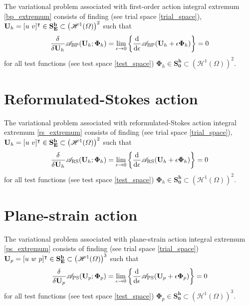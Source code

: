 The variational problem associated with first-order action integral extremum \cref{bp_extremum} consists of finding (see trial space \cref{trial_space}), $\mathbf{U}_h = [u\ v]^\intercal \in \mathbf{S_E^h} \subset \left( \mathscr{H}^1(\varOmega) \right)^2$ such that
\begin{align}
  \label{first_order_var_form_2}
  \frac{\delta{^{}} }{\delta \mathbf{U}_h{^{}} } \mathscr{A}_{\text{BP}}(\mathbf{U}_h; \bm{\Phi}_h) = \lim_{\epsilon \rightarrow 0} \left\{ \frac{\mathrm{d}{^{}} }{\mathrm{d} \epsilon{^{}} } \mathscr{A}_{\text{BP}}(\mathbf{U}_h + \epsilon \bm{\Phi}_h) \right\} = 0
\end{align}
for all test functions (see test space \cref{test_space}) $\bm{\Phi}_h \in \mathbf{S_0^h} \subset \left( \mathscr{H}^1(\Omega) \right)^2$.

\section{Reformulated-Stokes action}

The variational problem associated with reformulated-Stokes action integral extremum \cref{rs_extremum} consists of finding (see trial space \cref{trial_space}), $\mathbf{U}_h = [u\ v]^\intercal \in \mathbf{S_E^h} \subset \left( \mathscr{H}^1(\varOmega) \right)^2$ such that
\begin{align}
  \label{reformulated_var_form_2}
  \frac{\delta{^{}} }{\delta \mathbf{U}_h{^{}} } \mathscr{A}_{\text{RS}} (\mathbf{U}_h; \bm{\Phi}_h) = \lim_{\epsilon \rightarrow 0} \left\{ \frac{\mathrm{d}{^{}} }{\mathrm{d} \epsilon{^{}} } \mathscr{A}_{\text{RS}}(\mathbf{U}_h + \epsilon \bm{\Phi}_h) \right\} = 0
\end{align}
for all test functions (see test space \cref{test_space}) $\bm{\Phi}_h \in \mathbf{S_0^h} \subset \left( \mathscr{H}^1(\Omega) \right)^2$.

\section{Plane-strain action}

The variational problem associated with plane-strain action integral extremum \cref{ps_extremum} consists of finding (see trial space \cref{trial_space}) $\mathbf{U}_p = [u\ w\ p]^\intercal \in \mathbf{S_E^h} \subset \left( \mathscr{H}^1(\varOmega) \right)^3$ such that
\begin{align}
  \label{plane_strain_var_form_2}
  \frac{\delta{^{}} }{\delta \mathbf{U}_p{^{}} } \mathscr{A}_{\text{PS}}(\mathbf{U}_p; \bm{\Phi}_p) = \lim_{\epsilon \rightarrow 0} \left\{ \frac{\mathrm{d}{^{}} }{\mathrm{d} \epsilon{^{}} } \mathscr{A}_{\text{PS}}(\mathbf{U}_p + \epsilon \bm{\Phi}_p) \right\} = 0
\end{align}
for all test functions (see test space \cref{test_space}) $\bm{\Phi}_p \in \mathbf{S_0^h} \subset \left( \mathscr{H}^1(\Omega) \right)^3$.

